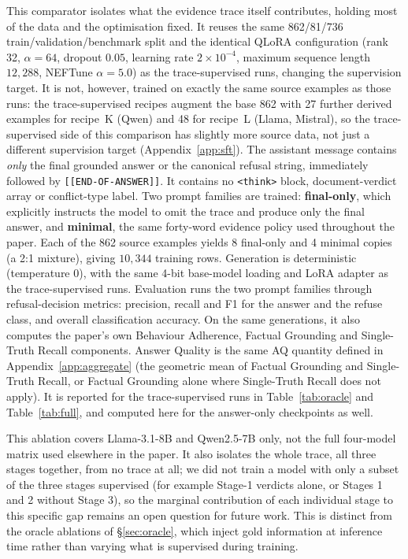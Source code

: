 This comparator isolates what the evidence trace itself contributes, holding
most of the data and the optimisation fixed. It reuses the same 862/81/736
train/validation/benchmark split and the identical QLoRA configuration (rank
32, $\alpha=64$, dropout $0.05$, learning rate $2\times10^{-4}$, maximum
sequence length $12{,}288$, NEFTune $\alpha=5.0$) as the trace-supervised
runs, changing the supervision target. It is not, however, trained on
exactly the same source examples as those runs: the trace-supervised recipes
augment the base 862 with 27 further derived examples for recipe~K (Qwen)
and 48 for recipe~L (Llama, Mistral), so the trace-supervised side of this
comparison has slightly more source data, not just a different supervision
target (Appendix~\ref{app:sft}). The
assistant message contains \emph{only} the final grounded answer or the
canonical refusal string, immediately followed by \texttt{[[END-OF-ANSWER]]}.
It contains no \texttt{<think>} block, document-verdict array or
conflict-type label. Two prompt families are trained: \textbf{final-only},
which explicitly instructs the model to omit the trace and produce only the
final answer, and \textbf{minimal}, the same forty-word evidence policy used
throughout the paper. Each of the 862 source examples yields 8 final-only and
4 minimal copies (a 2:1 mixture), giving $10{,}344$ training rows. Generation
is deterministic (temperature $0$), with the same 4-bit base-model loading and
LoRA adapter as the trace-supervised runs. Evaluation runs the two prompt
families through refusal-decision metrics: precision, recall and F1 for the
answer and the refuse class, and overall classification accuracy. On the
same generations, it also computes the paper's own Behaviour Adherence, Factual Grounding and
Single-Truth Recall components. Answer Quality is the same AQ quantity defined
in Appendix~\ref{app:aggregate} (the geometric mean of Factual Grounding and
Single-Truth Recall, or Factual Grounding alone where Single-Truth Recall does
not apply). It is reported for the trace-supervised runs in
Table~\ref{tab:oracle} and Table~\ref{tab:full}, and computed here for the
answer-only checkpoints as well.

This ablation covers Llama-3.1-8B and Qwen2.5-7B only, not the full
four-model matrix used elsewhere in the paper. It also isolates the whole
trace, all three stages together, from no trace at all; we did not train a
model with only a subset of the three stages supervised (for example
Stage-1 verdicts alone, or Stages 1 and 2 without Stage 3), so the marginal
contribution of each individual stage to this specific gap remains an open
question for future work. This is distinct from the oracle ablations of
\S\ref{sec:oracle}, which inject gold information at inference time rather
than varying what is supervised during training.

